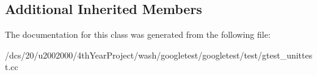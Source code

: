 \subsection*{Additional Inherited Members}


The documentation for this class was generated from the following file\+:\begin{DoxyCompactItemize}
\item 
/dcs/20/u2002000/4th\+Year\+Project/wash/googletest/googletest/test/gtest\+\_\+unittest.\+cc\end{DoxyCompactItemize}
